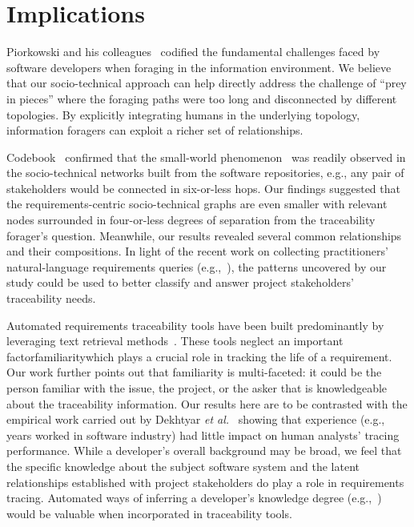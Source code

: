 \section{Implications}
Piorkowski and his colleagues~\cite{navValueCost} codified the fundamental challenges faced by software developers when foraging in the information environment. We believe that our socio-technical approach can help directly address the challenge of ``prey in pieces'' where the foraging paths were too long and disconnected by different topologies. By explicitly integrating humans in the underlying topology, information foragers can exploit a richer set of relationships.

Codebook~\cite{codebook10} confirmed that the small-world phenomenon~\cite{Chakrabarti-CSUR06} was readily observed in the socio-technical networks built from the software repositories, e.g., any pair of stakeholders would be connected in six-or-less hops. Our findings suggested that the requirements-centric socio-technical graphs are even smaller with relevant nodes surrounded in four-or-less degrees of separation from the traceability forager's question. Meanwhile, our results revealed several common relationships and their compositions. In light of the recent work on collecting practitioners' natural-language requirements queries (e.g.,~\cite{Pruski-REJ15, Lohar-REFSQ16, Malviya-RE17}), the patterns uncovered by our study could be used to better classify and answer project stakeholders' traceability needs.

Automated requirements traceability tools have been built predominantly by leveraging text retrieval methods~\cite{ICSE15}. These tools neglect an important factor\textemdash familiarity\textemdash which plays a crucial role in tracking the life of a requirement. Our work further points out that familiarity is multi-faceted: it could be the person familiar with the issue, the project, or the asker that is knowledgeable about the traceability information. Our results here are to be contrasted with the empirical work carried out by Dekhtyar \emph{et al.}~\cite{Dekhtyar-RE11} showing that experience (e.g., years worked in software industry) had little impact on human analysts' tracing performance. While a developer's overall background may be broad, we feel that the specific knowledge about the subject software system and the latent relationships established with project stakeholders do play a role in requirements tracing. Automated ways of inferring a developer's knowledge degree (e.g.,~\cite{Fritz-TOSEM14}) would be valuable when incorporated in traceability tools.

